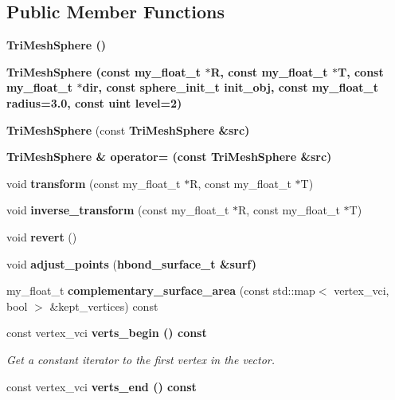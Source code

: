 \subsection*{Public Member Functions}
\begin{CompactItemize}
\item 
\bf{Tri\-Mesh\-Sphere} ()
\item 
\bf{Tri\-Mesh\-Sphere} (const my\_\-float\_\-t $\ast$R, const my\_\-float\_\-t $\ast$T, const my\_\-float\_\-t $\ast$dir, const \bf{sphere\_\-init\_\-t} init\_\-obj, const my\_\-float\_\-t radius=3.0, const uint level=2)
\item 
\textbf{Tri\-Mesh\-Sphere} (const \bf{Tri\-Mesh\-Sphere} \&src)\label{classASCbase_1_1geometry_1_1TriMeshSphere_b6396ee2c69154d55a327987b04c56b7}

\item 
\bf{Tri\-Mesh\-Sphere} \& \textbf{operator=} (const \bf{Tri\-Mesh\-Sphere} \&src)\label{classASCbase_1_1geometry_1_1TriMeshSphere_285b18dae29b3919d6516ced3f4a861c}

\item 
void \textbf{transform} (const my\_\-float\_\-t $\ast$R, const my\_\-float\_\-t $\ast$T)\label{classASCbase_1_1geometry_1_1TriMeshSphere_9e9bf1d856a40799f6fa385f8192427b}

\item 
void \textbf{inverse\_\-transform} (const my\_\-float\_\-t $\ast$R, const my\_\-float\_\-t $\ast$T)\label{classASCbase_1_1geometry_1_1TriMeshSphere_6a11da9e82a8ba89afb1ceaec4fd5e3e}

\item 
void \textbf{revert} ()\label{classASCbase_1_1geometry_1_1TriMeshSphere_baa72acd8f2096aa9995855d5d8c1375}

\item 
void \textbf{adjust\_\-points} (\bf{hbond\_\-surface\_\-t} \&surf)\label{classASCbase_1_1geometry_1_1TriMeshSphere_a550da12f3d525e8dc9472bb5c590fb8}

\item 
my\_\-float\_\-t \textbf{complementary\_\-surface\_\-area} (const std::map$<$ vertex\_\-vci, bool $>$ \&kept\_\-vertices) const \label{classASCbase_1_1geometry_1_1TriMeshSphere_453ba64dab8da3831126f9d89c948db6}

\item 
const vertex\_\-vci \bf{verts\_\-begin} () const \label{classASCbase_1_1geometry_1_1TriMeshSphere_3ee17324150856a0629eaf5eac7a388c}

\begin{CompactList}\small\item\em Get a constant iterator to the first vertex in the vector. \item\end{CompactList}\item 
const vertex\_\-vci \bf{verts\_\-end} () const \label{classASCbase_1_1geometry_1_1TriMeshSphere_edc98936bdb42ffbf98656b8caa6595a}


\end{CompactItemize}
